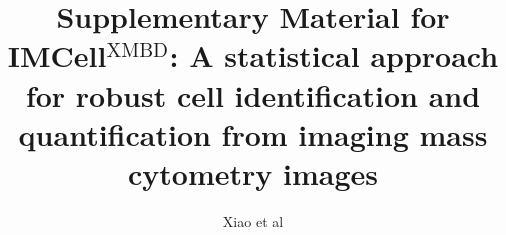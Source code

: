 \documentclass[utf8]{article}
\begin{document}
\onecolumn


\title{Supplementary Material for \\
IMCell$^\textrm{XMBD}$: A statistical approach for robust cell identification and quantification from imaging mass cytometry images}

\author{Xiao et al}
\date{}
\maketitle






\end{document}
